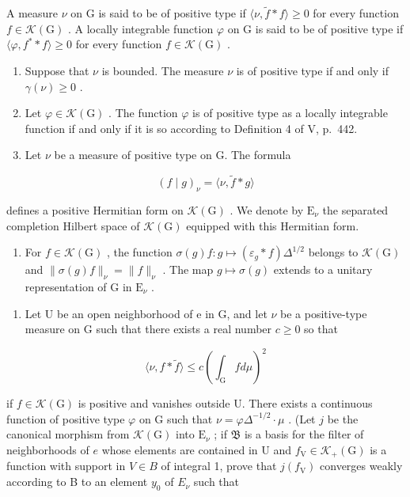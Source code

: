 A measure \(\nu\) on G is said to be of positive type if \(\langle \nu, \tilde{f} * f \rangle \geqslant 0\) for every function \(f \in \mathcal{K}(\mathrm{G})\) . A locally integrable function \(\varphi\) on G is said to be of positive type if \(\langle \varphi, f^* * f \rangle \geqslant 0\) for every function \(f \in \mathcal{K}(\mathrm{G})\) .

\begin{enumerate}
\def\labelenumi{\alph{enumi})}
\item
  Suppose that \(\nu\) is bounded. The measure \(\nu\) is of positive type if and only if \(\gamma(\nu) \geqslant 0\) .
\item
  Let \(\varphi\in\mathcal{K}(\mathrm{G})\) . The function \(\varphi\) is of positive type as a locally integrable function if and only if it is so according to Definition 4 of V, p.~442.
\item
  Let \(\nu\) be a measure of positive type on G. The formula
\end{enumerate}

\[
(f \mid g) _ {\nu} = \langle \nu , \widetilde {f} * g \rangle
\]

defines a positive Hermitian form on \(\mathcal{K}(\mathrm{G})\) . We denote by \(\mathrm{E}_{\nu}\) the separated completion Hilbert space of \(\mathcal{K}(\mathrm{G})\) equipped with this Hermitian form.

\begin{enumerate}
\def\labelenumi{\alph{enumi})}
\setcounter{enumi}{3}
\tightlist
\item
  For \(f \in \mathcal{K}(\mathrm{G})\) , the function \(\sigma(g)f \colon g \mapsto (\varepsilon_g * f)\Delta^{1/2}\) belongs to \(\mathcal{K}(\mathrm{G})\) and \(\| \sigma(g)f \|_{\nu} = \|f\|_{\nu}\) . The map \(g \mapsto \sigma(g)\) extends to a unitary representation of G in \(\mathrm{E}_{\nu}\) .
\end{enumerate}

\begin{enumerate}
\def\labelenumi{\alph{enumi})}
\setcounter{enumi}{4}
\tightlist
\item
  Let U be an open neighborhood of e in G, and let \(\nu\) be a positive-type measure on G such that there exists a real number \(c \geqslant 0\) so that
\end{enumerate}

\[
\langle \nu , f * \widetilde {f} \rangle \leqslant c \left(\int_ {\mathrm{G}} f d \mu\right) ^ {2}
\]

  if \(f \in \mathcal{K}(\mathrm{G})\) is positive and vanishes outside U. There exists a continuous function of positive type \(\varphi\) on G such that \(\nu = \varphi \Delta^{-1/2} \cdot \mu\) . (Let \(j\) be the canonical morphism from \(\mathcal{K}(\mathrm{G})\) into \(\mathrm{E}_{\nu}\) ; if \(\mathfrak{B}\) is a basis for the filter of neighborhoods of \(e\) whose elements are contained in U and \(f_{\mathrm{V}} \in \mathcal{K}_{+}(\mathrm{G})\) is a function with support in \(V \in B\) of integral 1, prove that \(j(f_{\mathrm{V}})\) converges weakly according to B to an element \(y_{0}\) of \(E_{\nu}\) such that

